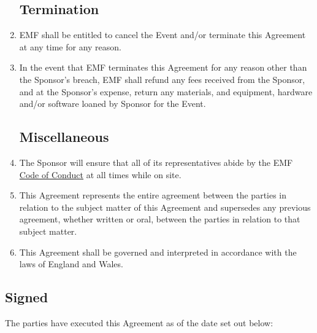 \begin{enumerate}
\subsection*{Termination}

\item EMF shall be entitled to cancel the Event and/or terminate this Agreement at any
time for any reason.
\item In the event that EMF terminates this Agreement for any reason other than the Sponsor's
breach, EMF shall refund any fees received from the Sponsor, and at the Sponsor's expense,
return any materials, and equipment, hardware and/or software loaned by Sponsor for the Event.

\subsection*{Miscellaneous}

\item The Sponsor will ensure that all of its representatives abide by the EMF
        \href{https://www.emfcamp.org/code-of-conduct}{Code of Conduct} at all times while on site.

\item This Agreement represents the entire agreement between the parties in relation to the subject
        matter of this Agreement and supersedes any previous agreement, whether written or oral,
        between the parties in relation to that subject matter.
\item This Agreement shall be governed and interpreted in accordance with the laws of England and Wales.

\end{enumerate}


\subsection*{Signed}
The parties have executed this Agreement as of the date set out below:



\newpage





